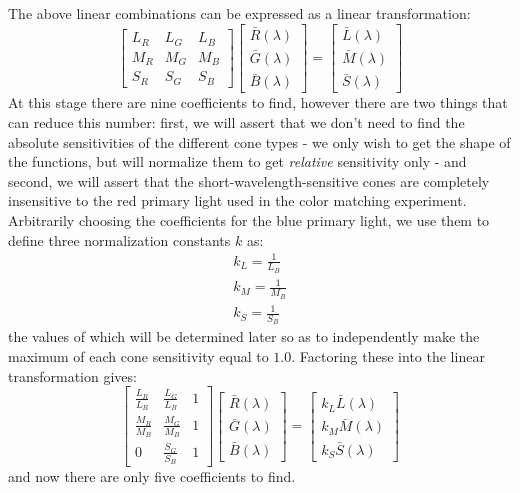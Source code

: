 \documentclass[twocolumn]{article}
\begin{document}
The above linear combinations can be expressed as a linear transformation:
\begin{equation}
    \begin{bmatrix}
        L_R&L_G&L_B\\
        M_R&M_G&M_B\\
        S_R&S_G&S_B
    \end{bmatrix}\begin{bmatrix}
        \bar{R}(\lambda)\\
        \bar{G}(\lambda)\\
        \bar{B}(\lambda)
    \end{bmatrix}=\begin{bmatrix}
        \bar{L}(\lambda)\\
        \bar{M}(\lambda)\\
        \bar{S}(\lambda)
    \end{bmatrix}
\end{equation}
At this stage there are nine coefficients to find, however there are two things that can reduce this number: first, we will assert that we don't need to find the absolute sensitivities of the different cone types - we only wish to get the shape of the functions, but will normalize them to get \textit{relative} sensitivity only - and second, we will assert that the short-wavelength-sensitive cones are completely insensitive to the red primary light used in the color matching experiment.  Arbitrarily choosing the coefficients for the blue primary light, we use them to define three normalization constants $k$ as:
\begin{equation}\label{eq:cone_fundamental_normalization_constants_symbolic}
    \begin{aligned}
        k_L=\frac{1}{L_B}\\
        k_M=\frac{1}{M_B}\\
        k_S=\frac{1}{S_B}
    \end{aligned}
\end{equation}
the values of which will be determined later so as to independently make the maximum of each cone sensitivity equal to $1.0$.  Factoring these into the linear transformation gives:
\begin{equation}\label{eq:cone_fundamental_linear_transformation_symbolic_simplified}
    \begin{bmatrix}
        \frac{L_R}{L_B}&\frac{L_G}{L_B}&1\\
        \frac{M_R}{M_B}&\frac{M_G}{M_B}&1\\
        0&\frac{S_G}{S_B}&1
    \end{bmatrix}\begin{bmatrix}
        \bar{R}(\lambda)\\
        \bar{G}(\lambda)\\
        \bar{B}(\lambda)
    \end{bmatrix}=\begin{bmatrix}
        k_L\bar{L}(\lambda)\\
        k_M\bar{M}(\lambda)\\
        k_S\bar{S}(\lambda)
    \end{bmatrix}
\end{equation}
and now there are only five coefficients to find.
\end{document}
